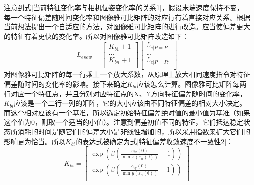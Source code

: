 \documentclass[fontset=fandol,type=bachelor,campus=harbin,bsmainpagenumberline=true]{hithesisbook}
\begin{document}
注意到式\ref{当前特征变化率与相机位姿变化率的关系1}，假设末端速度保持不变，每一个特征偏差随时间变化率和图像雅可比矩阵的对应行有着直接对应关系。根据当前想法提出一个自适应的方法，对图像雅可比矩阵的进行改造。应当使偏差更大的特征有着更快的变化率。所以对图像雅可比矩阵改造如下：
\begin{equation}
L_{enew}=\left[ \begin{array}{c}
	K_{b1}+1\\
	...\\
	K_{bn}+1\\
\end{array} \right] \left[ \begin{array}{c}
	L_{e|P=P_1}\\
	...\\
	L_{e|P=Pn}\\
\end{array} \right] 
\label{特征偏差收敛速度不一致性1}
\end{equation}
对图像雅可比矩阵的每一行乘上一个放大系数，从原理上放大相同速度指令对特征偏差随时间的变化率的影响。接下来确定$K_{bi}$应该怎么计算。图像雅可比矩阵每两行对应一个特征点，并且分别对应特征点的X、Y方向特征偏差随时间的变化率，$K_{bi}$应该是一个二行一列的矩阵，它的大小应该由不同特征偏差的相对大小决定。而这个相对应该有一个基准，所以选定初始特征偏差绝对值的最小值为基准（如果这个值为0，则取一个适当的小值）。注意到偏差初值不同的特征，它们抵达稳定状态所消耗的时间是随它们的偏差大小是非线性增加的，所以采用指数来扩大它们的影响更为恰当。所以$K_{bi}$的表达式被确定为式\ref{特征偏差收敛速度不一致性2}：
\begin{equation}
K_{bi}=\left[ \begin{array}{c}
	\exp \left( \beta \left( \frac{e_{ix}\left( 0 \right)}{\min x\left( \varepsilon _n\left( 0 \right) \right)}-1 \right) \right)\\
	\exp \left( \beta \left( \frac{e_{iy}\left( 0 \right)}{\min y\left( \varepsilon _n\left( 0 \right) \right)}-1 \right) \right)\\
\end{array} \right] 
\label{特征偏差收敛速度不一致性2}
\end{equation}
\end{document}
